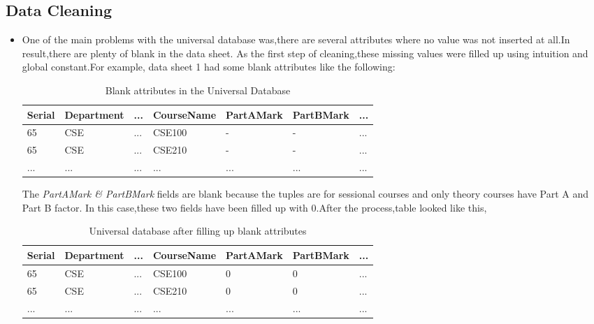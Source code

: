 \documentclass[a4paper,12pt]{book}
\begin{document}
\subsection{Data Cleaning}
\begin{itemize}
\item One of the main problems with the universal database was,there are several attributes where no value was not inserted at all.In result,there are plenty of blank in the data sheet. As the first step of cleaning,these missing values were filled up using intuition and global constant.For example, data sheet 1 had some blank attributes like the following:
\begin {table}[H]
\caption {Blank attributes in the Universal Database} \label{tab:title}
\begin{center}
\begin{tabular}{ | m{1cm} | m{2cm}| m{0.5cm}| m{2cm} | m{2cm} | m{2cm} |  m{0.5cm} | } 
\hline
Serial & Department & ... & CourseName & PartAMark & PartBMark & ... \\ 
\hline
65 & CSE & ... & CSE100 & - & - & ... \\ 
\hline
65 & CSE & ... & CSE210 & - & - & ... \\ 
\hline
... & ... & ... & ... & ... & ... & ... \\ 
\hline
\end{tabular}
\end{center}
\end{table}
The \textit{PartAMark \& PartBMark} fields are blank because the tuples are for sessional courses and only theory courses have Part A and Part B factor. \newline
In this case,these two fields have been filled up with 0.After the process,table looked like this,
\begin {table}[H]
\caption {Universal database after filling up blank attributes} \label{tab:title}
\begin{center}
\begin{tabular}{ | m{1cm} | m{2cm}| m{0.5cm}| m{2cm} | m{2cm} | m{2cm} |  m{0.5cm} | } 
\hline
Serial & Department & ... & CourseName & PartAMark & PartBMark & ... \\ 
\hline
65 & CSE & ... & CSE100 & 0 & 0 & ... \\ 
\hline
65 & CSE & ... & CSE210 & 0 & 0 & ... \\ 
\hline
... & ... & ... & ... & ... & ... & ... \\ 
\hline
\end{tabular}
\end{center}

\end{table}
\end{itemize}
\end{document}
